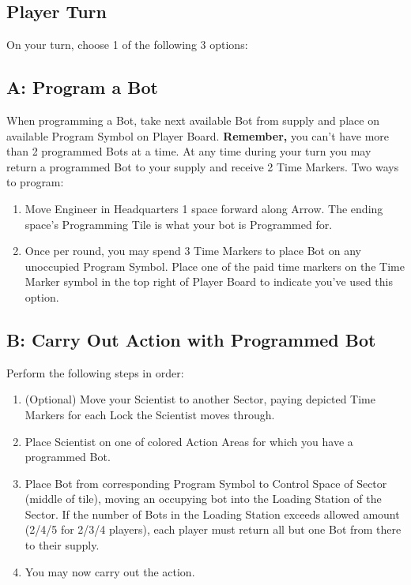 \documentclass[12pt]{article}
\newenvironment{enumerateCustom}
{\begin{enumerate}
  \setlength{\itemsep}{1pt}
  \setlength{\parskip}{0pt}
  \setlength{\parsep}{0pt}}
{\end{enumerate}}
\begin{document}
\begin{multicols*}{2}
\section*{Player Turn}
On your turn, choose 1 of the following 3 options:

\subsection*{A: Program a Bot}
    When programming a Bot, take next available Bot from supply and place on available Program Symbol on Player Board. \textbf{Remember, } you can't have more than 2 programmed Bots at a time. At any time during your turn you may return a programmed Bot to your supply and receive 2 Time Markers. Two ways to program:
\begin{enumerateCustom}
    \item Move Engineer in Headquarters 1 space forward along Arrow. The ending space's Programming Tile is what your bot is Programmed for.
    \item Once per round, you may spend 3 Time Markers to place Bot on any unoccupied Program Symbol. Place one of the paid time markers on the Time Marker symbol in the top right of Player Board to indicate you've used this option.
\end{enumerateCustom}

\subsection*{B: Carry Out Action with Programmed Bot}
Perform the following steps in order:

\begin{enumerateCustom}
    \item (Optional) Move your Scientist to another Sector, paying depicted Time Markers for each Lock the Scientist moves through.
    \item Place Scientist on one of colored Action Areas for which you have a programmed Bot.
    \item Place Bot from corresponding Program Symbol to Control Space of Sector (middle of tile), moving an occupying bot into the Loading Station of the Sector. If the number of Bots in the Loading Station exceeds allowed amount (2/4/5 for 2/3/4 players), each player must return all but one Bot from there to their supply.
    \item You  may now carry out the action.
\end{enumerateCustom}


\end{multicols*}
\end{document}
